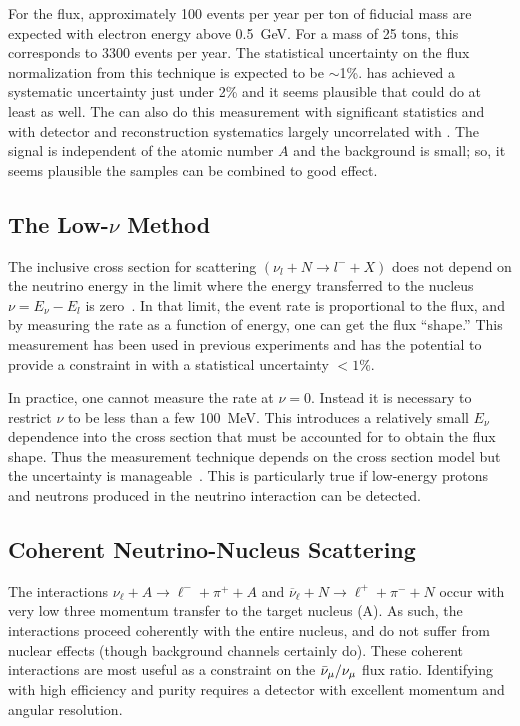 For the  flux, approximately \num{100} events per year per ton of fiducial mass are expected with electron energy above \SI{0.5}{GeV}. For a  mass of 25 tons, this corresponds to \num{3300} events per year. The statistical uncertainty on the flux normalization from this technique is expected to be $\sim$1\%.  has achieved a systematic uncertainty just under 2\% and it seems plausible that \dune could do at least as well\cite{bib:minervanue}. The  can also do this measurement with significant statistics and with detector and reconstruction systematics largely uncorrelated with .  The signal is independent of the atomic number $A$ and the background is small; so, it seems plausible the samples can be combined to good effect.


\subsection{The Low-$\nu$ Method}
\label{ssec:intro-low-nu}
The inclusive cross section for  scattering $(\nu_l+N\rightarrow l^-+X)$ does not depend on the neutrino energy in the limit where the energy transferred to the nucleus $\nu = E_\nu-E_{l} $ is zero~\cite{bib:original_lownu}.  In that limit, the event rate is proportional to the flux, and by measuring the rate as a function of energy, one can get the flux ``shape.'' This measurement has been used in previous experiments and has the potential to provide a constraint in \dune with a statistical uncertainty $<1\%$.

In practice, one cannot measure the rate at $\nu=0$. Instead it is necessary to restrict $\nu$ to be less than a few \SI{100}{MeV}.  This introduces a relatively small $E_\nu$ dependence into the cross section that must be accounted for to obtain the flux shape. Thus the  measurement technique depends on the cross section model but the uncertainty is manageable~\cite{bib:bodek_lownu}. This is particularly true if low-energy protons and neutrons produced in the neutrino interaction can be detected. 

\subsection{Coherent Neutrino-Nucleus Scattering}

The interactions $\nu_\ell + A \rightarrow \ell^- + \pi^+ + A$ and 
$\overline{\nu}_\ell + N    \rightarrow \ell^+ + \pi^- + N$  
occur with very low three momentum transfer to the target nucleus (A).  As such, the interactions proceed coherently with the entire nucleus, and do not suffer from nuclear effects (though background channels certainly do). These coherent interactions are most useful as a constraint on the $\bar\nu_\mu/\nu_\mu$ flux ratio. Identifying with high efficiency and purity requires a detector with excellent momentum and angular resolution.

